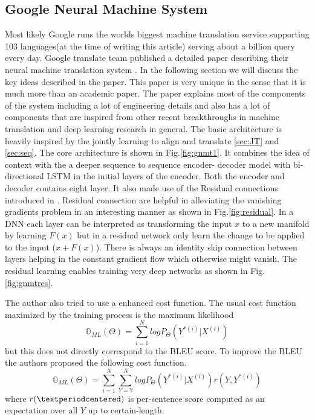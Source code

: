 \documentclass[a4paper]{article}
\begin{document}
\subsection{Google Neural Machine System}
Most  likely  Google  runs   the  worlds  biggest  machine  translation  service
supporting  103 languages(at the time of writing this article)  serving  about a
billion  query  every day. Google  translate  team  published  a  detailed paper
describing their neural machine translation  system \cite{wu2016google}. In  the
following section we  will discuss  the key  ideas described in the  paper. This
paper is  very unique in the sense that it is much more than an  academic paper.
The  paper explains  most of the components of  the  system  including a lot  of
engineering  details and  also has a lot  of  components  that are inspired from
other recent breakthroughs in machine translation and  deep learning research in
general.  The basic architecture is heavily inspired by the jointly  learning to
align and  translate  \ref{sec:JT}  and  \ref{sec:seq}. The core architecture is
shown in Fig.\ref{fig:gnmt1}. It combines the idea of context with the a deeper
sequence  to sequence  encoder- decoder  model with bi-directional LSTM  in  the
initial layers  of  the  encoder. Both  the  encoder  and decoder contains eight
layer.  It   also   made  use  of  the  Residual   connections   introduced   in
\cite{he2016deep}. Residual connection  are helpful in alleviating the vanishing
gradients problem in an interesting manner  as shown in Fig.\ref{fig:residual}. In a
DNN  each  layer  can  be  interpreted as transforming  the  input  $x$ to a new
manifold by learning  $F(x)$  but in a residual network only learn the change to
be  applied to  the  input  ($x  +  F(x)$).  There  is always an  identity  skip
connection between layers helping in the constant gradient  flow which otherwise
might vanish. The residual learning enables training very deep networks as shown
in Fig.\ref{fig:gnmtres}.

The author  also tried to use a enhanced  cost function. The usual cost function
maximized    by    the   training    process    is   the   maximum    likelihood
$$\mathbb{O}_{ML}(\Theta) = \sum_{i=1}^N log P_\Theta(Y^{*(i)} | X^{(i)}) $$ but
this does not directly correspond to  the BLEU score. To improve  the  BLEU  the
authors  proposed  the  following cost  function.  $$ \mathbb{O}_{ML}(\Theta)  =
\sum_{i=1}^N  \sum_{Y=\mathbb{Y}}^N   log  P_\Theta(Y^{*(i)}   |  X^{(i)})  r(Y,
Y^{*(i)} ) $$ where  $r(\textperiodcentered)$ is per-sentence score  computed as
an expectation over all $Y$ up to certain-length.
\end{document}
